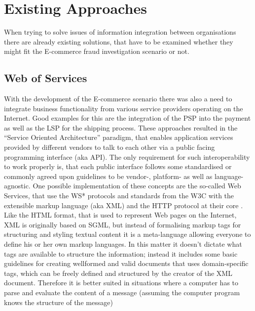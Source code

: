 
\section{Existing Approaches}
\label{sec:system_approaches}

When trying to solve issues of information integration between organisations there are already existing solutions, that have to be examined whether they might fit the E-commerce fraud investigation scenario or not.

\subsection{Web of Services}
\label{subsec:web_services}

With the development of the E-commerce scenario there was also a need to integrate business functionality from various service providers operating on the Internet. Good examples for this are the integration of the \gls{PSP} into the payment as well as the \gls{LSP} for the shipping process. These approaches resulted in the ``Service Oriented Architecture'' paradigm, that enables application services provided by different vendors to talk to each other via a public facing programming interface (aka \gls{API}). The only requirement for such interoperability to work properly is, that each public interface follows some standardised or commonly agreed upon guidelines to be vendor-, platform- as well as language-agnostic. One possible implementation of these concepts are the so-called Web Services, that use the WS* protocols and standards from the \gls{W3C} with the extensible markup language (aka \gls{XML}) and the \gls{HTTP} protocol at their core \citep{josuttis2007soa}. \\

Like the \gls{HTML} format, that is used to represent Web pages on the Internet, \gls{XML} is originally based on \gls{SGML}, but instead of formalising markup tags for structuring and styling textual content it is a meta-language allowing everyone to define his or her own markup languages. In this matter it doesn’t dictate what tags are available to structure the information; instead it includes some basic guidelines for creating wellformed and valid documents that uses domain-specific tags, which can be freely defined and structured by the creator of the XML document. Therefore it is better suited in situations where a computer has to parse and evaluate the content of a message (assuming the computer program knows the structure of the message) \\

